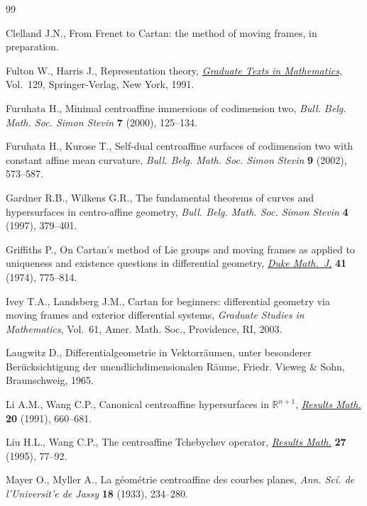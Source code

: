 \begin{thebibliography}{99}
\footnotesize \itemsep=0pt

Clelland J.N., From {F}renet to {C}artan: the method of moving frames, in
  preparation.

Fulton W., Harris J., Representation theory, \href{http://dx.doi.org/10.1007/978-1-4612-0979-9}{\textit{Graduate Texts in
  Mathematics}}, Vol.~129, Springer-Verlag, New York, 1991.

Furuhata H., Minimal centroaffine immersions of codimension two, \textit{Bull.
  Belg. Math. Soc. Simon Stevin} \textbf{7} (2000), 125--134.

Furuhata H., Kurose T., Self-dual centroaffine surfaces of codimension two with
  constant affine mean curvature, \textit{Bull. Belg. Math. Soc. Simon Stevin}
  \textbf{9} (2002), 573--587.

Gardner R.B., Wilkens G.R., The fundamental theorems of curves and
  hypersurfaces in centro-affine geo\-met\-ry, \textit{Bull. Belg. Math. Soc. Simon
  Stevin} \textbf{4} (1997), 379--401.

Griffiths P., On {C}artan's method of {L}ie groups and moving frames as applied
  to uniqueness and existence questions in differential geometry, \href{http://dx.doi.org/10.1215/S0012-7094-74-04180-5}{\textit{Duke
  Math.~J.}} \textbf{41} (1974), 775--814.

Ivey T.A., Landsberg J.M., Cartan for beginners: differential geometry via
  moving frames and exterior differential systems, \textit{Graduate Studies in
  Mathematics}, Vol.~61, Amer. Math. Soc., Providence, RI, 2003.

Laugwitz D., Differentialgeometrie in {V}ektorr\"aumen, unter besonderer
  {B}er\"ucksichtigung der unendlichdimensionalen {R}\"aume, Friedr. Vieweg \&
  Sohn, Braunschweig, 1965.

Li A.M., Wang C.P., Canonical centroaffine hypersurfaces in {${\mathbb
  R}^{n+1}$}, \href{http://dx.doi.org/10.1007/BF03323203}{\textit{Results Math.}} \textbf{20} (1991), 660--681.

Liu H.L., Wang C.P., The centroaffine {T}chebychev operator, \href{http://dx.doi.org/10.1007/BF03322271}{\textit{Results
  Math.}} \textbf{27} (1995), 77--92.

Mayer O., Myller A., La g\'eom\'etrie centroaffine des courbes planes,
  \textit{Ann. {S}c\'i. de l'{U}niversit'e de {J}assy} \textbf{18} (1933),
  234--280.


\end{thebibliography}
